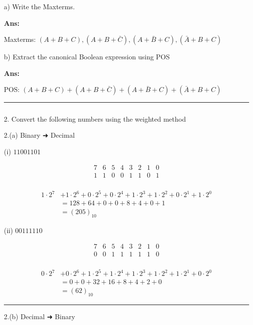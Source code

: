 \documentclass[
  a4paper,
]{article}
\makeatletter
\let\oldsubparagraph\subparagraph
\renewcommand{\subparagraph}{
    \@ifstar
      \xxxSubParagraphStar
      \xxxSubParagraphNoStar
  }
\newcommand{\xxxSubParagraphStar}[1]{\oldsubparagraph*{#1}\mbox{}}
\newcommand{\xxxSubParagraphNoStar}[1]{\oldsubparagraph{#1}\mbox{}}
\makeatother
\begin{document}
a) Write the Maxterms.

\textbf{Ans:}

Maxterms: \((A+B+C), (A+B+\bar{C}), (A+\bar{B}+C), (\bar{A}+B+C)\)

b) Extract the canonical Boolean expression using POS

\textbf{Ans:}

POS: \((A+B+C) + (A+B+\bar{C}) + (A+\bar{B}+C) + (\bar{A}+B+C)\)

\begin{center}\rule{0.5\linewidth}{0.5pt}\end{center}

\subparagraph{2. Convert the following numbers using the weighted
method}\label{convert-the-following-numbers-using-the-weighted-method}

2.(a) Binary ➜ Decimal

(i) \(11001101\)

\[
\begin{matrix}
7 & 6 & 5 & 4 & 3 & 2 & 1 & 0 \\
1 & 1 & 0 & 0 & 1 & 1 & 0 & 1 \\
\end{matrix}
\]

\begin{align*}
1\cdot 2^7 &+ 1\cdot 2^6 + 0\cdot 2^5 + 0\cdot 2^4 + 1\cdot 2^3 + 1\cdot 2^2 + 0\cdot 2^1 + 1\cdot 2^0 \\
&= 128 + 64 + 0 + 0 + 8 + 4 + 0 + 1 \\
&= \boxed{(205)_{10}}
\end{align*}

(ii) \(00111110\)

\[
\begin{matrix}
7 & 6 & 5 & 4 & 3 & 2 & 1 & 0 \\
0 & 0 & 1 & 1 & 1 & 1 & 1 & 0 \\
\end{matrix}
\]

\begin{align*}
0\cdot 2^7 &+ 0\cdot 2^6 + 1\cdot 2^5 + 1\cdot 2^4 + 1\cdot 2^3 + 1\cdot 2^2 + 1\cdot 2^1 + 0\cdot 2^0 \\
&= 0 + 0 + 32 + 16 + 8 + 4 + 2 + 0 \\
&= \boxed{(62)_{10}}
\end{align*}

\begin{center}\rule{0.5\linewidth}{0.5pt}\end{center}

2.(b) Decimal ➜ Binary
\end{document}
